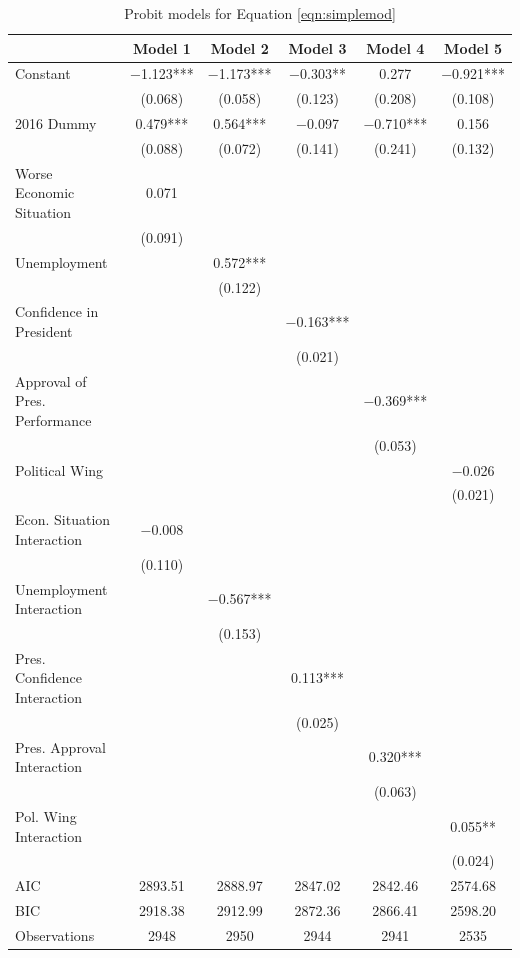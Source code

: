 \documentclass[floatsintext,man]{apa7}\usepackage[]{graphicx}\usepackage[]{color}
\begin{document}
\begin{table}[htbp]
\renewcommand{\arraystretch}{0.6}
\begin{center}
\caption{Probit models for Equation \ref{eqn:simplemod}}
\label{tab:probitsimp}

\begin{tabular}[t]{lccccc}
\toprule
  & Model 1 & Model 2 & Model 3 & Model 4 & Model 5\\
\midrule
Constant & \num{-1.123}*** & \num{-1.173}*** & \num{-0.303}** & \num{0.277} & \num{-0.921}***\\
 & (\num{0.068}) & (\num{0.058}) & (\num{0.123}) & (\num{0.208}) & (\num{0.108})\\
2016 Dummy & \num{0.479}*** & \num{0.564}*** & \num{-0.097} & \num{-0.710}*** & \num{0.156}\\
 & (\num{0.088}) & (\num{0.072}) & (\num{0.141}) & (\num{0.241}) & (\num{0.132})\\
Worse Economic Situation & \num{0.071} &  &  &  & \\
 & (\num{0.091}) &  &  &  & \\
Unemployment &  & \num{0.572}*** &  &  & \\
 &  & (\num{0.122}) &  &  & \\
Confidence in President &  &  & \num{-0.163}*** &  & \\
 &  &  & (\num{0.021}) &  & \\
Approval of Pres. Performance &  &  &  & \num{-0.369}*** & \\
 &  &  &  & (\num{0.053}) & \\
Political Wing &  &  &  &  & \num{-0.026}\\
 &  &  &  &  & (\num{0.021})\\
Econ. Situation Interaction & \num{-0.008} &  &  &  & \\
 & (\num{0.110}) &  &  &  & \\
Unemployment Interaction &  & \num{-0.567}*** &  &  & \\
 &  & (\num{0.153}) &  &  & \\
Pres. Confidence Interaction &  &  & \num{0.113}*** &  & \\
 &  &  & (\num{0.025}) &  & \\
Pres. Approval Interaction &  &  &  & \num{0.320}*** & \\
 &  &  &  & (\num{0.063}) & \\
Pol. Wing Interaction &  &  &  &  & \num{0.055}**\\
 &  &  &  &  & (\num{0.024})\\
\midrule
AIC & \num{2893.51} & \num{2888.97} & \num{2847.02} & \num{2842.46} & \num{2574.68}\\
BIC & \num{2918.38} & \num{2912.99} & \num{2872.36} & \num{2866.41} & \num{2598.20}\\
Observations & 2948 & 2950 & 2944 & 2941 & 2535\\
\bottomrule
\end{tabular}



\end{center}
\end{table}
\end{document}
